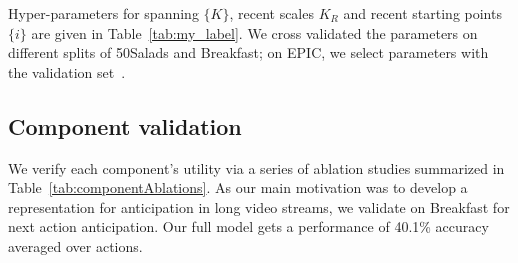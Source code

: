 \documentclass[runningheads]{llncs}
\begin{document}
Hyper-parameters for spanning $\{K\}$, recent scales $K_R$ and recent starting points $\{i\}$ are given in Table~\ref{tab:my_label}. We cross validated the parameters on different splits of 50Salads and Breakfast; on EPIC, we select parameters with the validation set~\cite{furnari2019rulstm}. 

\begin{table}[t!]
\centering
{}
\caption{Dataset details and our respective model parameters.}
\label{tab:my_label}
\end{table} 

\subsection{Component validation}\label{sec:ablations} 
We verify each component's utility via a series of ablation studies summarized in Table~\ref{tab:componentAblations}. As our main motivation was to develop a representation for anticipation in long video streams, we validate on Breakfast for next action anticipation.  Our full model gets a performance of 40.1\% accuracy averaged over actions. 
\end{document}

